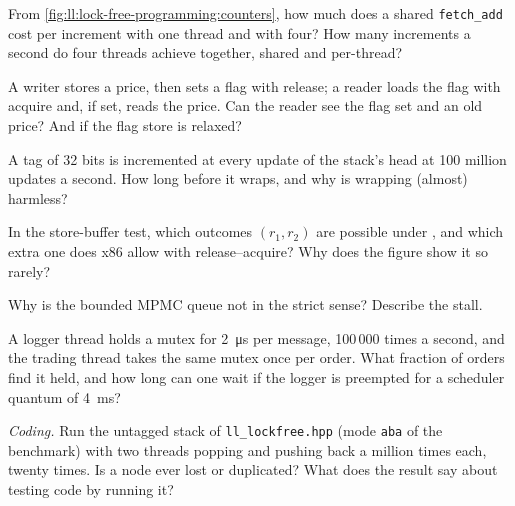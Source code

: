 \begin{exercise}[$\star$]\label{exo:ll:lock-free-programming:1}
From \cref{fig:ll:lock-free-programming:counters}, how much does a shared \texttt{fetch\_add} cost per increment with one
thread and with four? How many increments a second do four threads achieve together, shared and per-thread?
\end{exercise}

\begin{exercise}[$\star$]\label{exo:ll:lock-free-programming:2}
A writer stores a price, then sets a flag with release; a reader loads the flag with acquire and, if set, reads the price.
Can the reader see the flag set and an old price? And if the flag store is relaxed?
\end{exercise}

\begin{exercise}[$\star$]\label{exo:ll:lock-free-programming:3}
A tag of 32 bits is incremented at every update of the stack's head at 100 million updates a second. How long before it wraps,
and why is wrapping (almost) harmless?
\end{exercise}

\begin{exercise}[$\star\star$]\label{exo:ll:lock-free-programming:4}
In the store-buffer test, which outcomes $(r_1, r_2)$ are possible under , and which extra one does x86
allow with release--acquire? Why does the figure show it so rarely?
\end{exercise}

\begin{exercise}[$\star\star$]\label{exo:ll:lock-free-programming:5}
Why is the bounded MPMC queue not  in the strict sense? Describe the stall.
\end{exercise}

\begin{exercise}[$\star\star$]\label{exo:ll:lock-free-programming:6}
A logger thread holds a mutex for \qty{2}{\micro\second} per message, 100\,000 times a second, and the trading thread takes the
same mutex once per order. What fraction of orders find it held, and how long can one wait if the logger is preempted for a
scheduler quantum of \qty{4}{\milli\second}?
\end{exercise}

\begin{exercise}[$\star\star\star$]\label{exo:ll:lock-free-programming:7}
\emph{Coding.} Run the untagged stack of \texttt{ll\_lockfree.hpp} (mode \texttt{aba} of the benchmark) with two threads
popping and pushing back a million times each, twenty times. Is a node ever lost or duplicated? What does the result say about
testing  code by running it?
\end{exercise}

